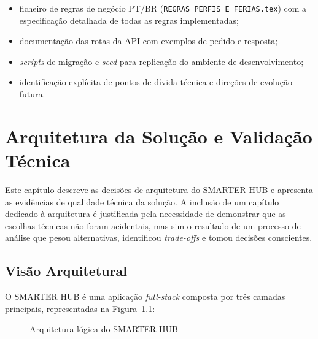 \documentclass[12pt, a4paper, twoside, openright]{report}
\begin{document}
\begin{itemize}
  \item ficheiro de regras de negócio PT/BR (\texttt{REGRAS\_PERFIS\_E\_FERIAS.tex})
        com a especificação detalhada de todas as regras implementadas;
  \item documentação das rotas da API com exemplos de pedido e resposta;
  \item \textit{scripts} de migração e \textit{seed} para replicação do ambiente
        de desenvolvimento;
  \item identificação explícita de pontos de dívida técnica e direções de evolução futura.
\end{itemize}

\chapter{Arquitetura da Solução e Validação Técnica}
\label{cap:arquitetura}

Este capítulo descreve as decisões de arquitetura do SMARTER HUB e apresenta
as evidências de qualidade técnica da solução. A inclusão de um capítulo dedicado
à arquitetura é justificada pela necessidade de demonstrar que as escolhas técnicas
não foram acidentais, mas sim o resultado de um processo de análise que pesou
alternativas, identificou \textit{trade-offs} e tomou decisões conscientes.

\section{Visão Arquitetural}

O SMARTER HUB é uma aplicação \textit{full-stack} composta por três camadas principais,
representadas na Figura~\ref{fig:arquitetura}:

\begin{figure}[H]
  \centering
  \caption{Arquitetura lógica do SMARTER HUB}
  \label{fig:arquitetura}
\end{figure}
\end{document}

